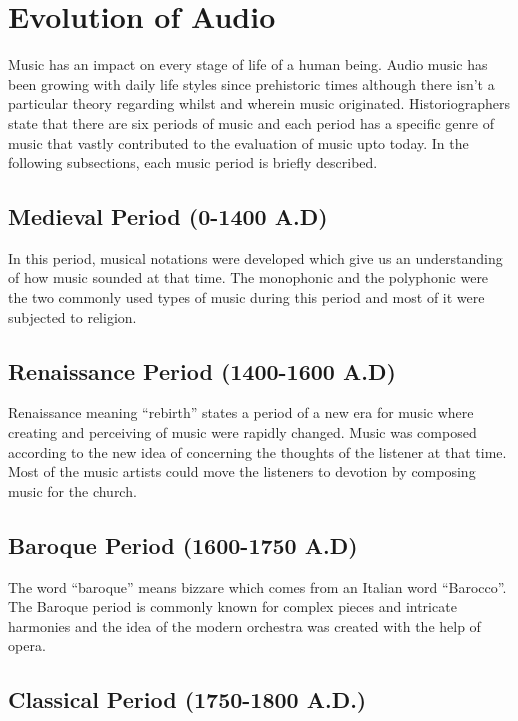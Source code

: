 \section{Evolution of Audio}

Music has an impact on every stage of life of a human being. Audio music has been growing 
with daily life styles since prehistoric times although there isn't a particular theory 
regarding whilst and wherein music originated. Historiographers state that there are six 
periods of music and each period has a specific genre of music that vastly contributed to 
the evaluation of music upto today. In the following subsections, each music period is 
briefly described.

\subsection{Medieval Period (0-1400 A.D)}

In this period, musical notations were developed which give us an understanding of how music 
sounded at that time. The monophonic and the polyphonic were the two commonly used types of 
music during this period and most of it were subjected to religion.

\subsection{Renaissance Period (1400-1600 A.D)}

Renaissance meaning “rebirth” states a period of a new era for music where creating and perceiving 
of music were rapidly changed. Music was composed according to the new idea of concerning the thoughts 
of the listener at that time. Most of the music artists could move the listeners to devotion 
by composing music for the church.

\subsection{Baroque Period (1600-1750 A.D)}

The word “baroque” means bizzare which comes from an Italian word “Barocco”. The Baroque period is 
commonly known for complex pieces and intricate harmonies and the idea of the modern orchestra was 
created with the help of opera.

\subsection{Classical Period (1750-1800 A.D.)}

